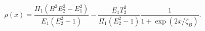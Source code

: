 \begin{equation}
\rho(x)=\frac{\Pi_{1}(B^{2}E_{2}^{2}-E_{1}^{2})}{E_{1}(E_{2}^{2}-1)}
-\frac{E_{1}T_{2}^{2}}{\Pi_{1}(E_{2}^{2}-1)}
\frac{1}{1+\exp(2x/\zeta_B)}.
\end{equation}

